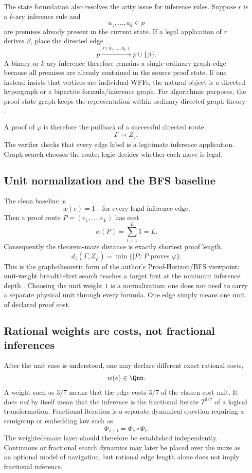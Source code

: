 The state formulation also resolves the arity issue for inference rules. Suppose $r$ is a $k$-ary inference rule and
\[
a_1,\ldots,a_k\in p
\]
are premises already present in the current state. If a legal application of $r$ derives $\beta$, place the directed edge
\[
p\xrightarrow{\,r(a_1,\ldots,a_k)\,}p\cup\{\beta\}.
\]
A binary or $k$-ary inference therefore remains a single ordinary graph edge because all premises are already contained in the source proof state. If one instead insists that vertices are individual WFFs, the natural object is a directed hypergraph or a bipartite formula/inference graph. For algorithmic purposes, the proof-state graph keeps the representation within ordinary directed graph theory \cite{depths}.

A proof of $\varphi$ is therefore the pullback of a successful directed route
\[
\Gamma\rightsquigarrow Z_\varphi.
\]
The verifier checks that every edge label is a legitimate inference application. Graph search chooses the route; logic decides whether each move is legal.

\subsection{Unit normalization and the BFS baseline}
The clean baseline is
\[
\boxed{w(e)=1\quad\text{for every legal inference edge}.}
\]
Then a proof route $P=(e_1,\ldots,e_L)$ has cost
\[
w(P)=\sum_{i=1}^L1=L.
\]
Consequently the theorem-maze distance is exactly shortest proof length,
\[
d_1(\Gamma,Z_\varphi)=\min\{|P|:P\text{ proves }\varphi\}.
\]
This is the graph-theoretic form of the author's Proof-Horizon/BFS viewpoint: unit-weight breadth-first search reaches a target first at the minimum inference depth \cite{depths,horizon}. Choosing the unit weight $1$ is a normalization: one does not need to carry a separate physical unit through every formula. One edge simply means one unit of declared proof cost.

\subsection{Rational weights are costs, not fractional inferences}
After the unit case is understood, one may declare different exact rational costs,
\[
w(e)\in\Qnn.
\]
A weight such as $3/7$ means that the edge costs $3/7$ of the chosen cost unit. It does \emph{not} by itself mean that the inference is the fractional iterate $T^{3/7}$ of a logical transformation. Fractional iteration is a separate dynamical question requiring a semigroup or embedding law such as
\[
\Phi_{s+t}=\Phi_s\circ\Phi_t.
\]
The weighted-maze layer should therefore be established independently. Continuous or fractional search dynamics may later be placed over the maze as an optional model of navigation, but rational edge length alone does not imply fractional inference.

